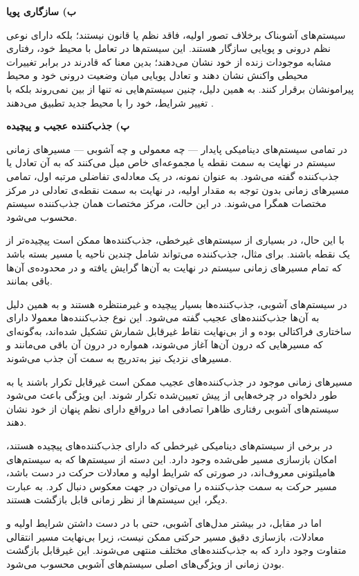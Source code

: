 \textbf{ب) سازگاری پویا}

سیستم‌های آشوبناک برخلاف تصور اولیه، فاقد نظم یا قانون نیستند؛ بلکه دارای نوعی نظم درونی و پویایی سازگار هستند. این سیستم‌ها در تعامل با محیط خود، رفتاری مشابه موجودات زنده از خود نشان می‌دهند؛ بدین معنا که قادرند در برابر تغییرات محیطی واکنش نشان دهند و تعادل پویایی میان وضعیت درونی خود و محیط پیرامونشان برقرار کنند. به همین دلیل، چنین سیستم‌هایی نه تنها از بین نمی‌روند بلکه با تغییر شرایط، خود را با محیط جدید تطبیق می‌دهند \cite{ref41}.

\textbf{پ) جذب‌کننده عجیب و پیچیده}

در تمامی سیستم‌های دینامیکی پایدار --- چه معمولی و چه آشوبی --- مسیرهای زمانی سیستم در نهایت به سمت نقطه یا مجموعه‌ای خاص میل می‌کنند که به آن تعادل یا جذب‌کننده گفته می‌شود. به عنوان نمونه، در یک معادله‌ی تفاضلی مرتبه اول، تمامی مسیرهای زمانی بدون توجه به مقدار اولیه، در نهایت به سمت نقطه‌ی تعادلی در مرکز مختصات همگرا می‌شوند. در این حالت، مرکز مختصات همان جذب‌کننده سیستم محسوب می‌شود.

با این حال، در بسیاری از سیستم‌های غیرخطی، جذب‌کننده‌ها ممکن است پیچیده‌تر از یک نقطه باشند. برای مثال، جذب‌کننده می‌تواند شامل چندین ناحیه یا مسیر بسته باشد که تمام مسیرهای زمانی سیستم در نهایت به آن‌ها گرایش یافته و در محدوده‌ی آن‌ها باقی بمانند.

در سیستم‌های آشوبی، جذب‌کننده‌ها بسیار پیچیده و غیرمنتظره هستند و به همین دلیل به آن‌ها جذب‌کننده‌های عجیب گفته می‌شود. این نوع جذب‌کننده‌ها معمولا دارای ساختاری فراکتالی بوده و از بی‌نهایت نقاط غیرقابل شمارش تشکیل شده‌اند، به‌گونه‌ای که مسیرهایی که درون آن‌ها آغاز می‌شوند، همواره در درون آن باقی می‌مانند و مسیرهای نزدیک نیز به‌تدریج به سمت آن جذب می‌شوند\cite{ref46}.

مسیرهای زمانی موجود در جذب‌کننده‌های عجیب ممکن است غیرقابل تکرار باشند یا به طور دلخواه در چرخه‌هایی از پیش تعیین‌شده تکرار شوند. این ویژگی باعث می‌شود سیستم‌های آشوبی رفتاری ظاهرا تصادفی اما درواقع دارای نظم پنهان از خود نشان دهند.

در برخی از سیستم‌های دینامیکی غیرخطی که دارای جذب‌کننده‌های پیچیده هستند، امکان بازسازی مسیر طی‌شده وجود دارد. این دسته از سیستم‌ها که به سیستم‌های هامیلتونی  معروف‌اند، در صورتی که شرایط اولیه و معادلات حرکت در دست باشد، مسیر حرکت به سمت جذب‌کننده را می‌توان در جهت معکوس دنبال کرد. به عبارت دیگر، این سیستم‌ها از نظر زمانی قابل بازگشت هستند.

اما در مقابل، در بیشتر مدل‌های آشوبی، حتی با در دست داشتن شرایط اولیه و معادلات، بازسازی دقیق مسیر حرکتی ممکن نیست، زیرا بی‌نهایت مسیر انتقالی متفاوت وجود دارد که به جذب‌کننده‌های مختلف منتهی می‌شوند. این غیرقابل بازگشت بودن زمانی از ویژگی‌های اصلی سیستم‌های آشوبی محسوب می‌شود.

